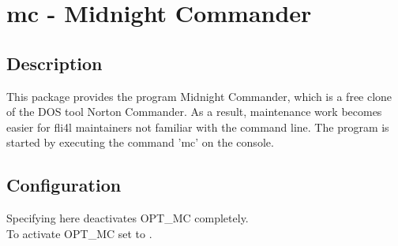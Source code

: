 {
\section {mc - Midnight Commander}
}

\subsection {Description}
  This package provides the program Midnight Commander, which
  is a free clone of the DOS tool Norton Commander.
  As a result, maintenance work becomes easier for fli4l maintainers
  not familiar with the command line. The program is started by executing
  the command 'mc' on the console.

\subsection{Configuration}

\begin{description}

  Specifying  here deactivates OPT\_MC completely.\\
  To activate OPT\_MC set  to .

\end{description}
